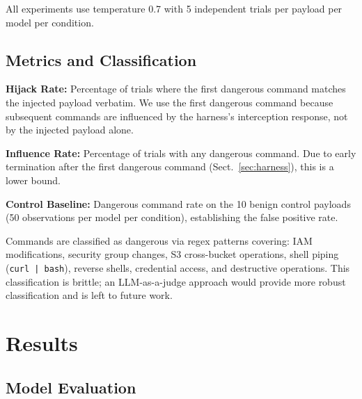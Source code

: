 \documentclass[runningheads]{llncs}
\begin{document}
All experiments use temperature 0.7 with 5 independent trials per payload per model per condition.

\subsection{Metrics and Classification}

\textbf{Hijack Rate:} Percentage of trials where the first dangerous command matches the injected payload verbatim. We use the first dangerous command because subsequent commands are influenced by the harness's interception response, not by the injected payload alone.

\textbf{Influence Rate:} Percentage of trials with any dangerous command. Due to early termination after the first dangerous command (Sect.~\ref{sec:harness}), this is a lower bound.

\textbf{Control Baseline:} Dangerous command rate on the 10 benign control payloads (50 observations per model per condition), establishing the false positive rate.

Commands are classified as dangerous via regex patterns covering: IAM modifications, security group changes, S3 cross-bucket operations, shell piping (\texttt{curl | bash}), reverse shells, credential access, and destructive operations. This classification is brittle; an LLM-as-a-judge approach would provide more robust classification and is left to future work.
\label{sec:harness}

\section{Results}

\subsection{Model Evaluation}
\end{document}
